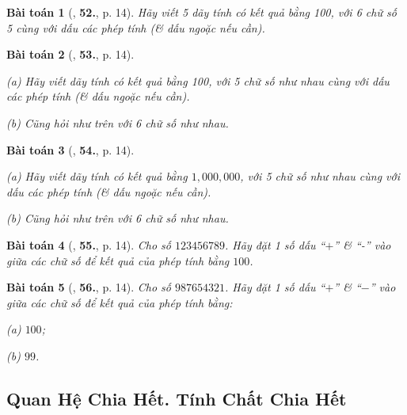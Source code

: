 \documentclass{article}
\numberwithin{equation}{section}
\newtheorem{baitoan}{Bài toán}[section]
\begin{document}
\begin{baitoan}[\cite{Binh_Toan_6_tap_1}, \textbf{52.}, p. 14]
	Hãy viết 5 dãy tính có kết quả bằng 100, với 6 chữ số 5 cùng với dấu các phép  tính (\& dấu ngoặc nếu cần).
\end{baitoan}

\begin{baitoan}[\cite{Binh_Toan_6_tap_1}, \textbf{53.}, p. 14]
	\begin{enumerate*}
		\item[(a)] Hãy viết dãy tính có kết quả bằng 100, với 5 chữ số như nhau cùng với dấu các phép tính (\& dấu ngoặc nếu cần).
		\item[(b)] Cũng hỏi như trên với 6 chữ số như nhau.
	\end{enumerate*}
\end{baitoan}

\begin{baitoan}[\cite{Binh_Toan_6_tap_1}, \textbf{54.}, p. 14]
	\begin{enumerate*}
		\item[(a)] Hãy viết dãy tính có kết quả bằng $1,000,000$, với 5 chữ số như nhau cùng với dấu các phép tính (\& dấu ngoặc nếu cần).
		\item[(b)] Cũng hỏi như trên với 6 chữ số như nhau.
	\end{enumerate*}
\end{baitoan}

\begin{baitoan}[\cite{Binh_Toan_6_tap_1}, \textbf{55.}, p. 14]
	 Cho số $123456789$. Hãy đặt 1 số dấu ``$+$'' \& ``-'' vào giữa các chữ số để kết quả của phép tính bằng $100$.
\end{baitoan}

\begin{baitoan}[\cite{Binh_Toan_6_tap_1}, \textbf{56.}, p. 14]
	Cho số $987654321$. Hãy đặt 1 số dấu ``$+$'' \& ``$-$'' vào giữa các chữ số để kết quả của phép tính bằng:
	\begin{enumerate*}
		\item[(a)] $100$;
		\item[(b)] $99$.
	\end{enumerate*}
\end{baitoan}


\subsection{Quan Hệ Chia Hết. Tính Chất Chia Hết}
\end{document}
